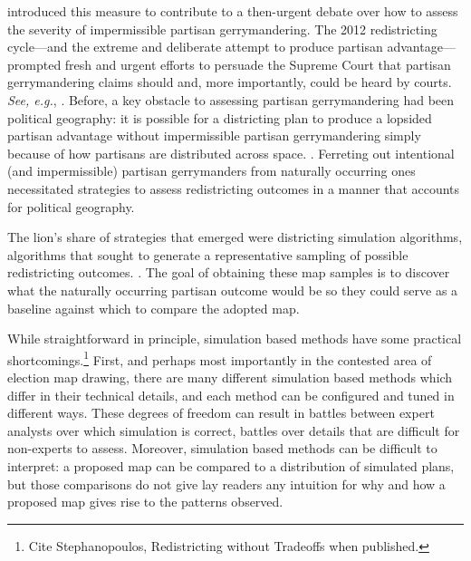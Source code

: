 \documentclass[12pt]{article}
\begin{document}
\cite{deford2022partisan} introduced this measure to contribute to a then-urgent debate over how to assess the severity of impermissible partisan gerrymandering. The 2012 redistricting cycle—and the extreme and deliberate attempt to produce partisan advantage—prompted fresh and urgent efforts to persuade the Supreme Court that partisan gerrymandering claims should and, more importantly, could be heard by courts. \textit{See, e.g.}, \cite{stephanopoulos2015partisan}. Before, a key obstacle to assessing partisan gerrymandering had been political geography: it is possible for a districting plan to produce a lopsided partisan advantage without impermissible partisan gerrymandering simply because of how partisans are distributed across space. \cite{chen2013unintentional,cain2018reasonable,eubank2020who}. Ferreting out intentional (and impermissible) partisan gerrymanders from naturally occurring ones necessitated strategies to assess redistricting outcomes in a manner that accounts for political geography.

The lion's share of strategies that emerged were districting simulation algorithms, algorithms that sought to generate a representative sampling of possible redistricting outcomes. \cite{chen2015cutting,cho2016talismanic,bangia2017redistricting,chikina2017assessing}. The goal of obtaining these map samples is to discover what the naturally occurring partisan outcome would be so they could serve as a baseline against which to compare the adopted map.

While straightforward in principle, simulation based methods have some practical shortcomings.\footnote{Cite Stephanopoulos, Redistricting without Tradeoffs when published.} First, and perhaps most importantly in the contested area of election map drawing, there are many different simulation based methods which differ in their technical details, and each method can be configured and tuned in different ways. These degrees of freedom can result in battles between expert analysts over which simulation is correct, battles over details that are difficult for non-experts to assess. Moreover, simulation based methods can be difficult to interpret: a proposed map can be compared to a distribution of simulated plans, but those comparisons do not give lay readers any intuition for why and how a proposed map gives rise to the patterns observed.
\end{document}
